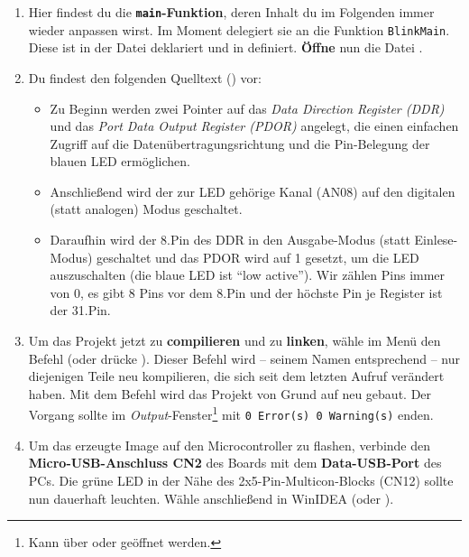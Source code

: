 \begin{enumerate}
\item
Hier findest du die \textbf{\lstinline|main|-Funktion}, deren Inhalt du im Folgenden immer wieder anpassen wirst.
Im Moment delegiert sie an die Funktion \lstinline|BlinkMain|.
Diese ist in der Datei  deklariert und in  definiert.
\textbf{Öffne} nun die Datei \textbf{}.

\item 
Du findest den folgenden Quelltext () vor:

\begin{itemize}
\item 
Zu Beginn werden zwei Pointer auf das \emph{Data Direction Register (DDR)} und das \emph{Port Data Output Register (PDOR)} angelegt, die einen einfachen Zugriff auf die Datenübertragungsrichtung und die Pin-Belegung der blauen LED ermöglichen.

\item 
Anschließend wird der zur LED gehörige Kanal (AN08) auf den digitalen (statt analogen) Modus geschaltet.

\item 
Daraufhin wird der 8.\;Pin des DDR in den Ausgabe-Modus (statt Einlese-Modus) geschaltet und das PDOR wird auf 1 gesetzt, um die LED auszuschalten (\dasheisst die blaue LED ist \enquote{low active}).
Wir zählen Pins immer von 0, \dasheisst es gibt 8 Pins vor dem 8.\;Pin und der höchste Pin je Register ist der 31.\;Pin.
\end{itemize}

\item 
Um das Projekt jetzt zu \textbf{compilieren} und zu \textbf{linken}, wähle im Menü  den Befehl  (oder drücke ).
Dieser Befehl wird -- seinem Namen entsprechend -- nur diejenigen Teile neu kompilieren, die sich seit dem letzten Aufruf verändert haben.
Mit dem Befehl  wird das Projekt von Grund auf neu gebaut.
Der Vorgang sollte im \emph{Output}-Fenster\footnote{Kann über  oder  geöffnet werden.} mit \texttt{0 Error(s)  0 Warning(s)} enden.

\item 
Um das erzeugte Image auf den Microcontroller zu flashen, verbinde den \textbf{Micro-USB-Anschluss CN2} des Boards mit dem \textbf{Data-USB-Port} des PCs.
Die grüne LED in der Nähe des 2x5-Pin-Multicon-Blocks (CN12) sollte nun dauerhaft leuchten.
Wähle anschließend in WinIDEA \textbf{} (oder ).



\end{enumerate}
